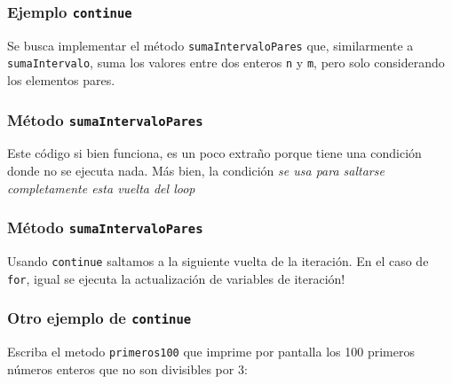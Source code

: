 \documentclass{beamer}
\newcommand{\code}[1]{\texttt{#1}}
\newcommand{\codet}[1]{\texttt{#1}}
\begin{document}
\begin{frame}
  \frametitle{Ejemplo \codet{continue}}

  \begin{block}{}
    Se busca implementar el método \code{sumaIntervaloPares} que,
    similarmente a \code{sumaIntervalo}, suma los valores entre dos
    enteros \code{n} y \code{m}, pero solo considerando los elementos
    pares.
  \end{block}
  
\end{frame}

\begin{frame}[fragile]
  \frametitle{Método \code{sumaIntervaloPares}}

  Este código si bien funciona, es un poco extraño porque tiene una
  condición donde no se ejecuta nada. Más bien, la condición \emph{se
    usa para saltarse completamente esta vuelta del loop}
  
\end{frame}

\begin{frame}[fragile]
  \frametitle{Método \code{sumaIntervaloPares}}

  Usando \code{continue} saltamos a la siguiente vuelta de la
  iteración. En el caso de \code{for}, igual se ejecuta la
  actualización de variables de iteración!
  
\end{frame}

\begin{frame}[fragile]
  \frametitle{Otro ejemplo de \code{continue}}

  Escriba el metodo \code{primeros100} que imprime por pantalla los 100 primeros números enteros que no son
  divisibles por 3:

\end{frame}
\end{document}
